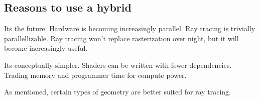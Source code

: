 \subsection{Reasons to use a hybrid}

Its the future. Hardware is becoming increasingly parallel. Ray tracing is trivially parallellizable. Ray tracing won't replace rasterization over night, but it will become increasingly useful.

Its conceptually simpler. Shaders can be written with fewer dependencies. Trading memory and programmer time for compute power.

As mentioned, certain types of geometry are better suited for ray tracing.

